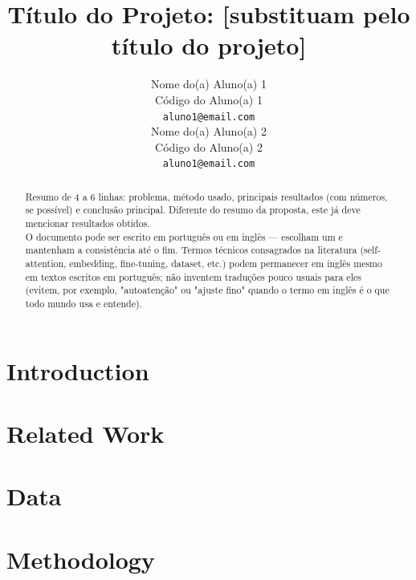 \documentclass{article}
\title{Título do Projeto: [substituam pelo título do projeto]}
\author{%
  Nome do(a) Aluno(a) 1 \\
  Código do Aluno(a) 1 \\
  \texttt{aluno1@email.com} \\
  \And
  Nome do(a) Aluno(a) 2 \\
  Código do Aluno(a) 2 \\
  \texttt{aluno1@email.com} \\
}
\begin{document}
\maketitle

\begin{abstract}
  Resumo de 4 a 6 linhas: problema, método usado, principais resultados
  (com números, se possível) e conclusão principal. Diferente do resumo
  da proposta, este já deve mencionar resultados obtidos. \\
  O documento pode ser escrito em português ou em inglês — escolham um e mantenham a consistência até o fim. Termos técnicos consagrados na literatura (self-attention, embedding, fine-tuning, dataset, etc.) podem permanecer em inglês mesmo em textos escritos em português; não inventem traduções pouco usuais para eles (evitem, por exemplo, "autoatenção" ou "ajuste fino" quando o termo em inglês é o que todo mundo usa e entende).
\end{abstract}

\section{Introduction}
\label{sec:intro}

\section{Related Work}
\label{sec:related}

\section{Data}
\label{sec:data}

\section{Methodology}
\label{sec:method}
\end{document}
